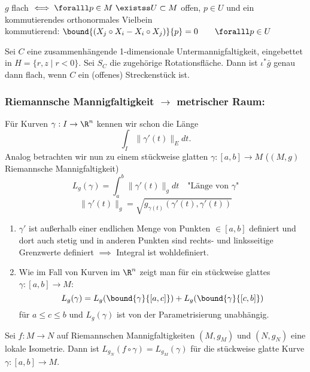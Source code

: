 \begin{rem}
	$g$ flach $ \iff \foralll p \in M \ \existss U \subset M $ offen, $p \in U$ und ein kommutierendes orthonormales Vielbein\\
	kommutierend: $ \bound{(X_j \circ X_i - X_i \circ X_j)}{p} = 0 \qquad \foralll p \in U $
\end{rem}

\begin{lem}
	Sei $C$ eine zusammenhängende 1-dimensionale Untermannigfaltigkeit, eingebettet in $ H = \{r,z \mid r<0\} $. Sei $S_C$ die zugehörige Rotationsfläche. Dann ist $ \iota^*\bar{g} $ genau dann flach, wenn $C$ ein (offenes) Streckenstück ist.
\end{lem}

\subsubsection*{Riemannsche Mannigfaltigkeit $\to$ metrischer Raum:}

Für Kurven $ \gamma: I \to \R^n $ kennen wir schon die Länge 
\[ \int_I \|\gamma'(t)\|_E dt. \]
Analog betrachten wir nun zu einem stückweise glatten $ \gamma: [a,b] \to M $ ($(M,g)$ Riemannsche Mannigfaltigkeit)
\[ L_g(\gamma) = \int_a^b \|\gamma'(t)\|_g dt \quad \text{"Länge von $\gamma$"} \]
\[ \|\gamma'(t)\|_g = \sqrt{g_{\gamma(t)} (\gamma'(t), \gamma'(t))} \]

\begin{rem}
	\begin{enumerate}[label={\roman*})]
		\item $\gamma'$ ist außerhalb einer endlichen Menge von Punkten $\in [a,b]$ definiert und dort auch stetig und in anderen Punkten sind rechts- und linksseitige Grenzwerte definiert $\implies$ Integral ist wohldefiniert.
		\item Wie im Fall von Kurven im $\R^n$ zeigt man für ein stückweise glattes $\gamma: [a,b] \to M$:
		\[ L_g(\gamma) = L_g (\bound{\gamma}{[a,c]}) + L_g (\bound{\gamma}{[c,b]}) \]
		für $a \leq c \leq b$ und $L_g(\gamma)$ ist von der Parametrisierung unabhängig.
	\end{enumerate}
\end{rem}

\begin{lem}\label{6.12}
	Sei $ f: M \to N $ auf Riemannschen Mannigfaltigkeiten $(M,g_M)$ und $(N,g_N)$ eine lokale Isometrie. Dann ist $ L_{g_N}(f \circ \gamma) = L_{g_M} (\gamma) $ für die stückweise glatte Kurve $\gamma: [a,b] \to M$.
\end{lem}

